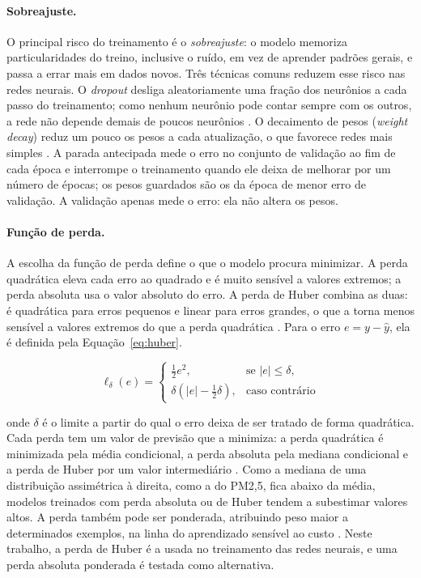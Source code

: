 \paragraph{Sobreajuste.} O principal risco do treinamento é o \emph{sobreajuste}: o modelo memoriza particularidades do treino, inclusive o ruído, em vez de aprender padrões gerais, e passa a errar mais em dados novos. Três técnicas comuns reduzem esse risco nas redes neurais. O \textit{dropout} desliga aleatoriamente uma fração dos neurônios a cada passo do treinamento; como nenhum neurônio pode contar sempre com os outros, a rede não depende demais de poucos neurônios \cite{srivastava2014dropout}. O decaimento de pesos (\textit{weight decay}) reduz um pouco os pesos a cada atualização, o que favorece redes mais simples \cite{loshchilov2019decoupled}. A parada antecipada mede o erro no conjunto de validação ao fim de cada época e interrompe o treinamento quando ele deixa de melhorar por um número de épocas; os pesos guardados são os da época de menor erro de validação. A validação apenas mede o erro: ela não altera os pesos.

\paragraph{Função de perda.} A escolha da função de perda define o que o modelo procura minimizar. A perda quadrática eleva cada erro ao quadrado e é muito sensível a valores extremos; a perda absoluta usa o valor absoluto do erro. A perda de Huber combina as duas: é quadrática para erros pequenos e linear para erros grandes, o que a torna menos sensível a valores extremos do que a perda quadrática \cite{huber1964robust}. Para o erro \(e=y-\hat{y}\), ela é definida pela Equação~\ref{eq:huber}.

\begin{equation}
    \ell_{\delta}(e)=
    \begin{cases}
        \frac{1}{2}e^2, & \text{se } |e| \leq \delta,\\
        \delta\left(|e|-\frac{1}{2}\delta\right), & \text{caso contrário}
    \end{cases}
    \label{eq:huber}
\end{equation}

\noindent onde \(\delta\) é o limite a partir do qual o erro deixa de ser tratado de forma quadrática. Cada perda tem um valor de previsão que a minimiza: a perda quadrática é minimizada pela média condicional, a perda absoluta pela mediana condicional e a perda de Huber por um valor intermediário \cite{gneiting2011making}. Como a mediana de uma distribuição assimétrica à direita, como a do PM2,5, fica abaixo da média, modelos treinados com perda absoluta ou de Huber tendem a subestimar valores altos. A perda também pode ser ponderada, atribuindo peso maior a determinados exemplos, na linha do aprendizado sensível ao custo \cite{elkan2001foundations}. Neste trabalho, a perda de Huber é a usada no treinamento das redes neurais, e uma perda absoluta ponderada é testada como alternativa.

